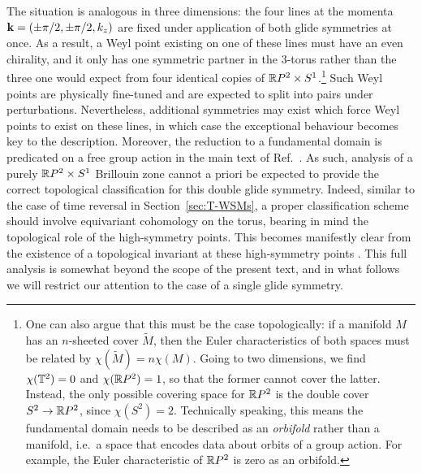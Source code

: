 The situation is analogous in three dimensions: the four lines at the momenta $\vb{k} = (\pm\pi/2,\pm\pi/2,k_z)$ are fixed under application of both glide symmetries at once. As a result, a Weyl point existing on one of these lines must have an even chirality, and it only has one symmetric partner in the 3-torus rather than the three one would expect from four identical copies of $\mathbb{R} P^2\times S^1$.\footnote{
	One can also argue that this must be the case topologically: if a manifold $M$ has an $n$-sheeted cover $\tilde{M}$, then the Euler characteristics of both spaces must be related by $\chi(\tilde{M}) = n\chi(M)$. Going to two dimensions, we find $\chi(\mathbb{T}^2) = 0$ and $\chi(\mathbb{R} P^2) = 1$, so that the former cannot cover the latter. Instead, the only possible covering space for $\mathbb{R} P^2$ is the double cover $S^2\to\mathbb{R} P^2$, since $\chi(S^2) = 2$. Technically speaking, this means the fundamental domain needs to be described as an \emph{orbifold} rather than a manifold, i.e.\ a space that encodes data about orbits of a group action. For example, the Euler characteristic of $\mathbb{R} P^2$ is zero as an orbifold.}
Such Weyl points are physically fine-tuned and are expected to split into pairs under perturbations. Nevertheless, additional symmetries may exist which force Weyl points to exist on these lines, in which case the exceptional behaviour becomes key to the description. %
Moreover, the reduction to a fundamental domain is predicated on a free group action in the main text of Ref.~\cite{Fonseca-Vaidya_nonorientable}. As such, analysis of a purely $\mathbb{R} P^2\times S^1$ Brillouin zone cannot a priori be expected to provide the correct topological classification for this double glide symmetry. Indeed, similar to the case of time reversal in Section~\ref{sec:T-WSMs}, a proper classification scheme should involve equivariant cohomology on the torus, bearing in mind the topological role of the high-symmetry points.
This becomes manifestly clear from the existence of a topological invariant at these high-symmetry points \cite{HZY_RP2,WangZhang_acoustic-Klein-2D}. This full analysis is somewhat beyond the scope of the present text, and in what follows we will restrict our attention to the case of a single glide symmetry.

